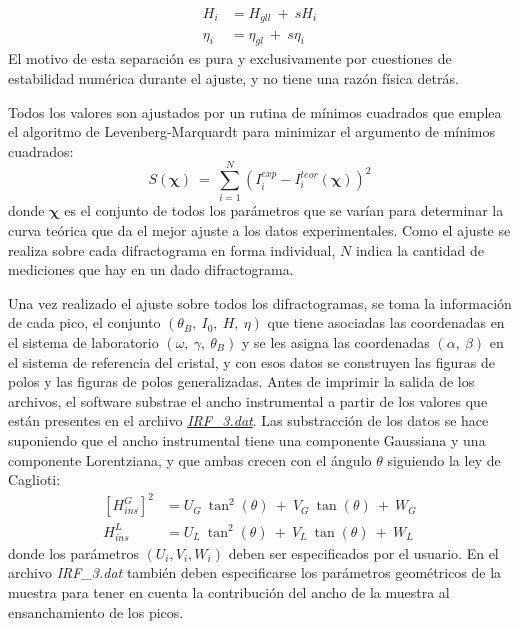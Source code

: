 \begin{align}
  H_i & = H_{gll} \ + \ sH_i \nonumber \\
  \eta_i & =  \eta_{gl} \ + \ s\eta_i
  \label{eq:global}
\end{align}
\noindent
El motivo de esta separación es pura y exclusivamente por cuestiones de estabilidad numérica durante el ajuste, y no tiene una razón física detrás.

Todos los valores son ajustados por un rutina de mínimos cuadrados que emplea el algoritmo de Levenberg-Marquardt\cite{wiki:Levenberg} para minimizar el argumento de mínimos cuadrados:
\begin{equation}
  S(\mathbf{\chi}) \ = \ \sum_{i=1}^{N} (I^{exp}_i - I^{teor}_i(\mathbf{\chi}))^2
  \label{eq:argmin}
\end{equation}
\noindent
donde $\mathbf{\chi}$ es el conjunto de todos los parámetros que se varían para determinar la curva teórica que da el mejor ajuste a los datos experimentales.
Como el ajuste se realiza sobre cada difractograma en forma individual, $N$ indica la cantidad de mediciones que hay en un dado difractograma.

Una vez realizado el ajuste sobre todos los difractogramas, se toma la información de cada pico, el conjunto $(\theta_B, \ I_0, \ H, \ \eta)$ que tiene asociadas las coordenadas en el sistema de laboratorio $(\omega, \ \gamma, \ \theta_B)$ y se les asigna las coordenadas  $(\alpha, \ \beta)$ en el sistema de referencia del cristal, y con esos datos se construyen las figuras de polos y las figuras de polos generalizadas.
Antes de imprimir la salida de los archivos, el software substrae el ancho instrumental a partir de los valores que están presentes en el archivo \hyperlink{IRF}{\textit{IRF\_3.dat}}.
Las substracción de los datos se hace suponiendo que el ancho instrumental tiene una componente Gaussiana y una componente Lorentziana, y que ambas crecen con el ángulo $\theta$ siguiendo la ley de Caglioti\cite{Caglioti1958}:
\begin{align}
  \left[H_{ins}^{G}\right]^2 & =  U_G \ \tan^2(\theta) \ + \ V_G \ \tan(\theta) \ + \ W_G \nonumber \\
  H_{ins}^{L} & =  U_L \ \tan^2(\theta) \ + \ V_L \ \tan(\theta) \ + \ W_L
  \label{eq:caglioti}
\end{align}
\noindent
donde los parámetros $(U_i, V_i, W_i)$ deben ser especificados por el usuario.
En el archivo \textit{IRF\_3.dat} también deben especificarse los parámetros geométricos de la muestra para tener en cuenta la contribución del ancho de la muestra al ensanchamiento de los picos.


